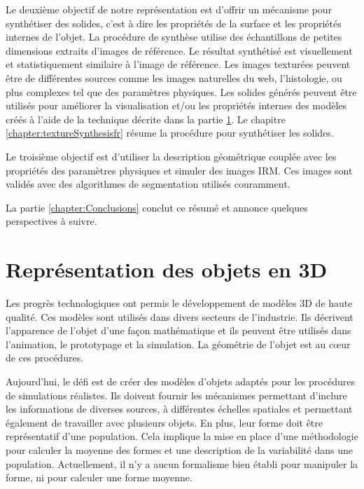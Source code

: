 Le deuxième objectif de notre représentation
est d'offrir un mécanisme
pour synthétiser des solides, c'est à dire les 
propriétés de la surface et les propriétés internes
de l'objet.
La procédure de synthèse utilise des échantillons de petites dimensions extraits d'images de référence.
Le résultat synthétisé est visuellement et statistiquement similaire à l'image de référence.
Les images texturées peuvent être de différentes sources comme
les images naturelles du web, l'histologie, ou plus complexes tel que des 
paramètres physiques.
Les solides générés peuvent être utilisés
pour améliorer la visualisation et/ou les propriétés internes des modèles créés
à l'aide de la technique décrite dans la partie \ref{sec:3DModelsfr}.
Le chapitre \ref{chapter:textureSynthesisfr} résume la procédure pour synthétiser les solides.


Le troisième objectif est d'utiliser
la description géométrique couplée 
avec les propriétés des paramètres physiques
et simuler des images IRM.
Ces images sont validés avec des algorithmes de segmentation utilisés couramment.

La partie \ref{chapter:Conclusions} conclut ce résumé et annonce quelques perspectives à suivre.

\section{Représentation des objets en 3D}
\label{sec:3DModelsfr}
Les progrès technologiques ont permis 
le développement de modèles 3D de haute qualité. Ces modèles sont utilisés 
dans divers secteurs de l'industrie.
Ils décrivent l'apparence de l'objet d'une façon mathématique
et ils peuvent être utilisés dans l'animation, le prototypage et la simulation.
La géométrie de l'objet est au cœur de ces procédures.

Aujourd'hui, le défi est de créer des modèles d'objets adaptés
pour les procédures de simulations réalistes.
Ils doivent fournir les mécanismes permettant d'inclure les 
informations de diverses sources, à différentes échelles spatiales et 
permettant également de travailler avec plusieurs objets.
En plus, leur forme doit être représentatif d'une population.
Cela implique la mise en place d'une méthodologie pour calculer 
la moyenne des formes et une description de la variabilité dans une population.
Actuellement, il n'y a aucun formalisme bien établi
pour manipuler la forme, ni pour calculer une forme moyenne.

